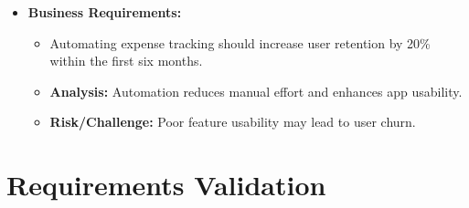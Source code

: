 \begin{itemize}
    \item \textbf{Business Requirements:}
    \begin{itemize}
        \item Automating expense tracking should increase user retention by 20\% within the first six months.
        \item \textbf{Analysis:} Automation reduces manual effort and enhances app usability.
        \item \textbf{Risk/Challenge:} Poor feature usability may lead to user churn.
    \end{itemize}
\end{itemize}


\newpage



\section{Requirements Validation}

